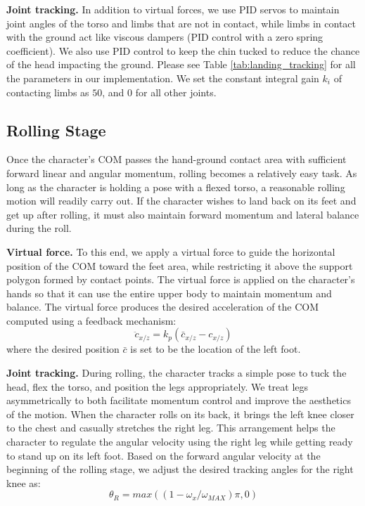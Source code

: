 \textbf{Joint tracking.} In addition to virtual forces, we use PID
servos to maintain joint angles of the torso and limbs that are not in
contact, while limbs in contact with the ground act like viscous
dampers (PID control with a zero spring coefficient). We also use PID
control to keep the chin tucked to reduce the chance of the head
impacting the ground. Please see Table \ref{tab:landing_tracking} for all the
parameters in our implementation. We set the constant integral gain
$k_i$ of contacting limbs as $50$, and $0$ for all other joints.



\subsection{Rolling Stage}
\label{sec:landing_rolling}
Once the character's COM passes the hand-ground contact area with
sufficient forward linear and angular momentum, rolling becomes a
relatively easy task. As long as the character is holding a pose with
a flexed torso, a reasonable rolling motion will readily carry out. If
the character wishes to land back on its feet and get up after
rolling, it must also maintain forward momentum and lateral balance
during the roll.

\textbf{Virtual force.} To this end, we apply a virtual force to guide
the horizontal position of the COM toward the feet area, while
restricting it above the support polygon formed by contact points. The
virtual force is applied on the character's hands so that it can use
the entire upper body to maintain momentum and
balance. The virtual force produces the desired acceleration of the COM 
computed using a feedback mechanism:
\begin{equation}
\label{eqn:landing_controlRoll}
\ddot{c}_{x/z} = k_p (\bar{c}_{x/z} - c_{x/z})
\end{equation}
where the desired position $\bar{c}$ is set to be the location of the
left foot.

\textbf{Joint tracking.} During rolling, the character tracks a simple
pose to tuck the head, flex the torso, and position the legs
appropriately. We treat legs asymmetrically to both facilitate
momentum control and improve the aesthetics of the motion. When the
character rolls on its back, it brings the left knee closer to the
chest and casually stretches the right leg. This arrangement helps the
character to regulate the angular velocity using the right leg while
getting ready to stand up on its left foot. Based on the forward
angular velocity at the beginning of the rolling stage, we adjust the
desired tracking angles for the right knee as:
\begin{equation}
\label{eqn:landing_controlLeg}
\theta_R = max( (1 - \omega_x / \omega_{MAX}) \pi, 0 )
\end{equation}


